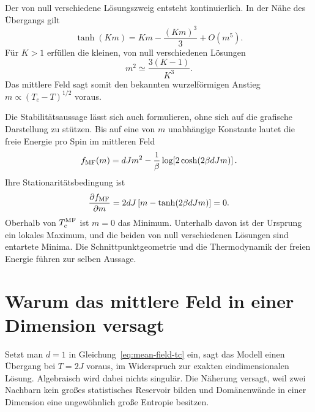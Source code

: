 Der von null verschiedene Lösungszweig entsteht kontinuierlich. In der Nähe des Übergangs gilt
\begin{equation}
\tanh(Km)=Km-\frac{(Km)^3}{3}+O(m^5).
\end{equation}
Für \(K>1\) erfüllen die kleinen, von null verschiedenen Lösungen
\begin{equation}
m^2\simeq \frac{3(K-1)}{K^3}.
\end{equation}
Das mittlere Feld sagt somit den bekannten wurzelförmigen Anstieg \(m\propto(T_c-T)^{1/2}\) voraus.

Die Stabilitätsaussage lässt sich auch formulieren, ohne sich auf die grafische Darstellung zu stützen. Bis auf eine von \(m\) unabhängige Konstante lautet die freie Energie pro Spin im mittleren Feld
\begin{equation}
f_{\rm MF}(m)
=dJm^2-\frac{1}{\beta}
\log\!\left[2\cosh(2\beta dJm)\right].
\label{eq:mf-free-energy}
\end{equation}
Ihre Stationaritätsbedingung ist
\begin{equation}
\frac{\partial f_{\rm MF}}{\partial m}
=2dJ\left[m-\tanh(2\beta dJm)\right]=0.
\end{equation}
Oberhalb von \(T_c^{\rm MF}\) ist \(m=0\) das Minimum. Unterhalb davon ist der Ursprung ein lokales Maximum, und die beiden von null verschiedenen Lösungen sind entartete Minima. Die Schnittpunktgeometrie und die Thermodynamik der freien Energie führen zur selben Aussage.

\begin{classroomqa}
\end{classroomqa}

\section{Warum das mittlere Feld in einer Dimension versagt}

Setzt man \(d=1\) in Gleichung~\eqref{eq:mean-field-tc} ein, sagt das Modell einen Übergang bei \(T=2J\) voraus, im Widerspruch zur exakten eindimensionalen Lösung. Algebraisch wird dabei nichts singulär. Die Näherung versagt, weil zwei Nachbarn kein großes statistisches Reservoir bilden und Domänenwände in einer Dimension eine ungewöhnlich große Entropie besitzen.

